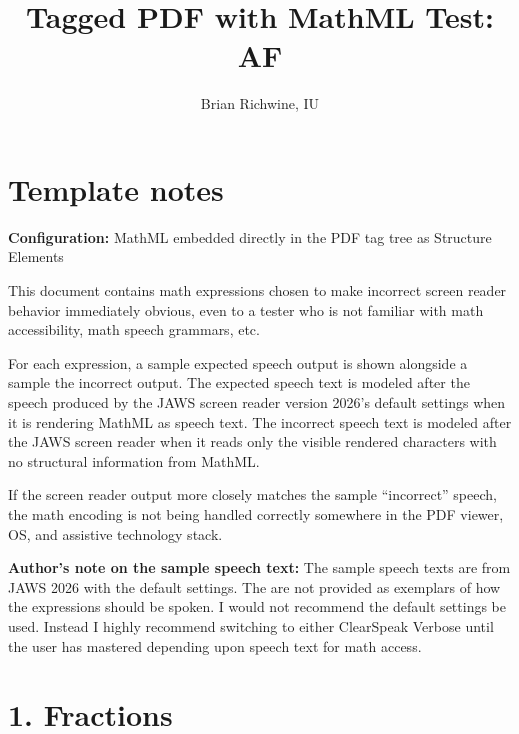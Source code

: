 \documentclass{article}
\title{Tagged PDF with MathML Test: AF}
\author{Brian Richwine, IU}
\date{}
\begin{document}
\raggedright

\maketitle

\section*{Template notes}

\textbf{Configuration:} MathML embedded directly in the PDF tag tree as Structure Elements


This document contains math expressions chosen to make incorrect screen 
reader behavior immediately obvious, even to a tester who is not familiar 
with math accessibility, math speech grammars, etc. 

For each expression, a sample expected speech output is shown alongside 
a sample the incorrect output. The expected speech text is modeled after 
the speech produced by the JAWS screen reader version 2026's default 
settings when it is rendering MathML as speech text. The incorrect speech 
text is modeled after the JAWS screen reader when it reads only the visible 
rendered characters with no structural information from MathML. 

If the screen reader output more closely matches the sample ``incorrect'' 
speech, the math encoding is not being handled correctly somewhere in 
the PDF viewer, OS, and assistive technology stack. 

\textbf{Author's note on the sample speech text:} The sample speech texts 
are from JAWS 2026 with the default settings. The are not provided as 
exemplars of how the expressions should be spoken. I would not recommend 
the default settings be used. Instead I highly recommend switching to 
either ClearSpeak Verbose until the user has mastered depending upon speech 
text for math access. 

\section*{1. Fractions}
\end{document}
